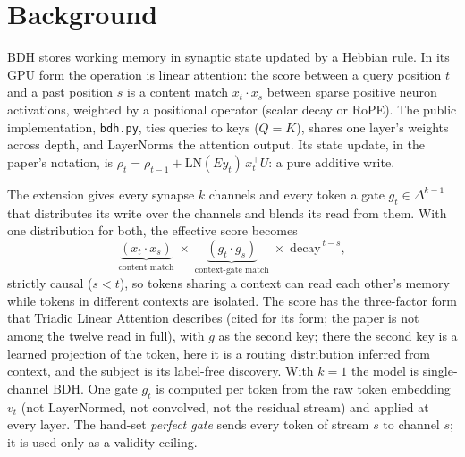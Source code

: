 \documentclass[11pt]{article}
\begin{document}
\section{Background}
\label{sec:background}

BDH \cite{bdh} stores working memory in synaptic state updated by a Hebbian rule. In its GPU form the operation is linear attention: the score between a query position $t$ and a past position $s$ is a content match $x_t \cdot x_s$ between sparse positive neuron activations, weighted by a positional operator (scalar decay or RoPE). The public implementation, \texttt{bdh.py}, ties queries to keys ($Q = K$), shares one layer's weights across depth, and LayerNorms the attention output. Its state update, in the paper's notation, is $\rho_{t} = \rho_{t-1} + \mathrm{LN}(E y_{t})\, x_{t}^{\top} U$: a pure additive write.

The extension gives every synapse $k$ channels and every token a gate $g_t \in \Delta^{k-1}$ that distributes its write over the channels and blends its read from them. With one distribution for both, the effective score becomes
\begin{equation}
\underbrace{(x_t \cdot x_s)}_{\text{content match}}\;\times\;\underbrace{(g_t \cdot g_s)}_{\text{context-gate match}}\;\times\;\mathrm{decay}^{\,t-s},
\label{eq:score}
\end{equation}
strictly causal ($s < t$), so tokens sharing a context can read each other's memory while tokens in different contexts are isolated. The score has the three-factor form that Triadic Linear Attention \cite{tla} describes (cited for its form; the paper is not among the twelve read in full), with $g$ as the second key; there the second key is a learned projection of the token, here it is a routing distribution inferred from context, and the subject is its label-free discovery. With $k = 1$ the model is single-channel BDH. One gate $g_t$ is computed per token from the raw token embedding $v_t$ (not LayerNormed, not convolved, not the residual stream) and applied at every layer. The hand-set \emph{perfect gate} sends every token of stream $s$ to channel $s$; it is used only as a validity ceiling.
\end{document}
